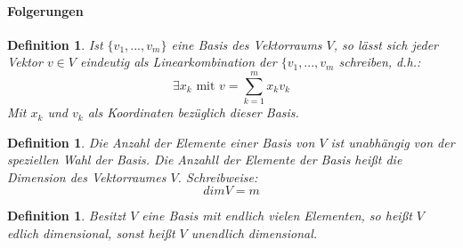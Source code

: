 \documentclass[12pt,a4paper]{article}%
\newtheorem{definition}[satz]{Definition}
\numberwithin{equation}{section}
\newcommand{\subsubsubsection}{\paragraph}
\def\mDef#1{
\begin{definition}
  #1
\end{definition}}
\numberwithin{equation}{subsection}
\begin{document}
     \subsubsubsection{Folgerungen}
     \begin{definition}
		  \glqq Ist $\lbrace v_1,...,v_m \rbrace$ eine Basis des Vektorraums $V$, so lässt sich jeder Vektor $v \in V$ eindeutig als Linearkombination der $\lbrace               
		    v_1,...,v_m$ schreiben, d.h.:
		    \begin{equation}
		      \exists x_k \text{ mit } v = \sum_{k=1}^m x_k v_k
		    \end{equation}
		    \grqq \cite{HM12}\newline
		    Mit $x_k$ und $v_k$ als Koordinaten bezüglich dieser Basis.
	    \end{definition}
	    
	    \begin{definition}
		    \glqq Die Anzahl der Elemente einer Basis von $V$ ist unabhängig von der speziellen Wahl der Basis. Die Anzahll der Elemente der Basis heißt die Dimension des Vektorraumes $V$.\grqq \cite{HM12} Schreibweise:
		    \begin{equation}
		      dim V = m
		    \end{equation}
		   \end{definition}
		   
		   \mDef{
		     \glqq Besitzt $V$ eine Basis mit endlich vielen Elementen, so heißt $V$ edlich dimensional, sonst heißt $V$ unendlich dimensional. \grqq \cite{HM12}
		   }
		   
\end{document}
